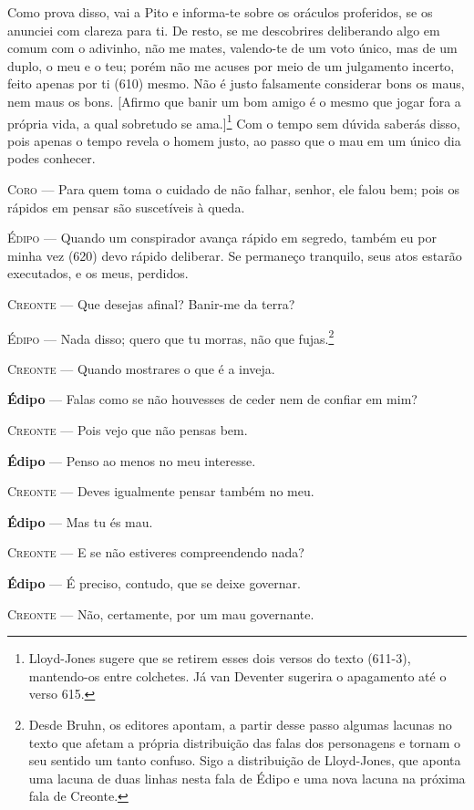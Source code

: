 Como prova disso, vai a Pito e informa-te sobre os oráculos proferidos,
se os anunciei com clareza para ti. De resto, se me descobrires
deliberando algo em comum com o adivinho, não me mates, valendo-te de um
voto único, mas de um duplo, o meu e o teu; porém não me acuses por meio
de um julgamento incerto, feito apenas por ti (610) mesmo. Não é justo
falsamente considerar bons os maus, nem maus os bons. {[}Afirmo que
banir um bom amigo é o mesmo que jogar fora a própria vida, a qual
sobretudo se ama.{]}\footnote{Lloyd-Jones sugere que se retirem esses
  dois versos do texto (611-3), mantendo-os entre colchetes. Já van
  Deventer sugerira o apagamento até o verso 615.} Com o tempo sem
dúvida saberás disso, pois apenas o tempo revela o homem justo, ao passo
que o mau em um único dia podes conhecer.

\textsc{Coro} --- Para quem toma o cuidado de não falhar, senhor, ele falou bem; pois os
rápidos em pensar são suscetíveis à queda.

\textsc{Édipo} --- Quando um conspirador avança rápido em segredo, também eu por minha vez
(620) devo rápido deliberar. Se permaneço tranquilo, seus atos estarão
executados, e os meus, perdidos.

\textsc{Creonte} --- Que desejas afinal? Banir-me da terra?

\textsc{Édipo} --- Nada disso; quero que tu morras, não que fujas.\footnote{Desde Bruhn, os editores apontam, a partir desse
  passo algumas lacunas no texto que afetam a própria distribuição das
  falas dos personagens e tornam o seu sentido um tanto confuso. Sigo a
  distribuição de Lloyd-Jones, que aponta uma lacuna de duas linhas
  nesta fala de Édipo e uma nova lacuna na próxima fala de Creonte.}

\textsc{Creonte} --- Quando mostrares o que é a inveja.

\textbf{Édipo} --- Falas como se não houvesses de ceder nem de confiar em mim?

\textsc{Creonte} --- Pois vejo que não pensas bem.

\textbf{Édipo} --- Penso ao menos no meu interesse.

\textsc{Creonte} --- Deves igualmente pensar também no meu.

\textbf{Édipo} --- Mas tu és mau.

\textsc{Creonte} --- E se não estiveres compreendendo nada?

\textbf{Édipo} --- É preciso, contudo, que se deixe governar.

\textsc{Creonte} --- Não, certamente, por um mau governante.


